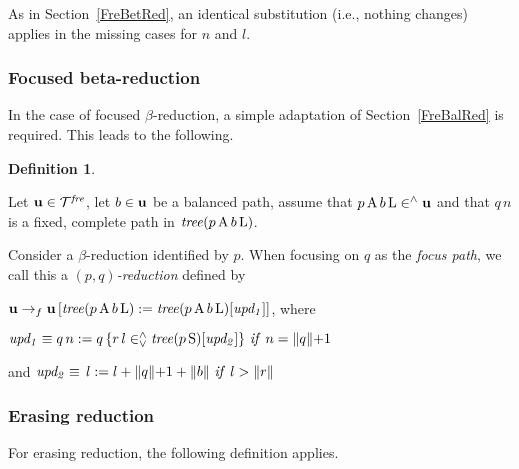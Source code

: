 \documentclass{article}
\theoremstyle{plain}
\theoremstyle{definition}
\newtheorem{Def}[The]{Definition}
\begin{document}
As in Section~\ref{FreBetRed}, an identical substitution (i.e., nothing changes) applies in the missing cases for $n$ and $l$.

\subsubsection{Focused beta-reduction}\label{FreBalFoc}

In the case of focused $\beta$-reduction, a simple adaptation of Section~\ref{FreBalRed} is required. This leads to the following.

\begin{Def}\label{DefBetFreFoc}

Let ${\bf u} \in {\cal T}^{\it fre}$, let $b \in {\bf u}$ be a balanced path, assume that $p \, {\rm A} \, b \, {\rm L} \in^\wedge {\bf u}$ and that $q \, n$ is a fixed, complete path in ${\it tree}(p \, {\rm A} \, b \, {\rm L})$.

Consider a $\beta$-reduction identified by $p$. When focusing on $q$ as the {\em focus path\/}, we call this a {\em $(p,q)$-reduction\/} defined by

\smallskip

${\bf u} \rightarrow_{f} {\bf u} \, [{\it tree}(p \, {\rm A} \, b \, {\rm L}) := {\it tree}(p \, {\rm A} \, b \, {\rm L})[{\it upd_1}]]$,
where

\smallskip


\hspace{1.5cm} ${\it upd_1} \equiv q \, n := q \, \{r \, l \in^\wedge_\vee {\it tree}(p \, {\rm S})[{\it upd_2}] \} ~{\it if}~ n =  \lVert q \lVert  + 1$

\smallskip

\hspace{3cm} and ${\it upd_2} \equiv \, l := l +  \lVert q \lVert  + 1 +  \lVert b \lVert  ~{\it if\/}~l >  \lVert r \lVert $
\end{Def}

\subsubsection{Erasing reduction}\label{FreBalEra}

For erasing reduction, the following definition applies.
\end{document}
